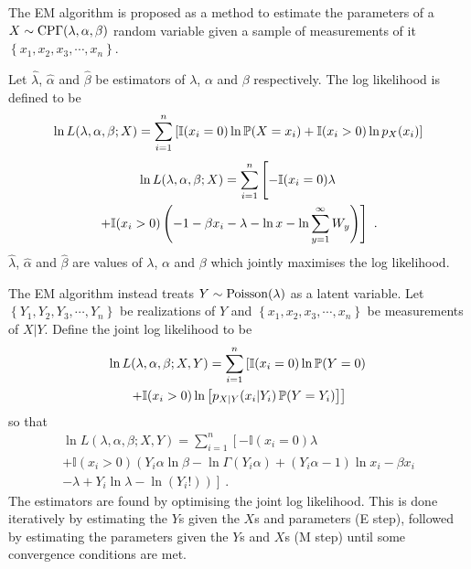 The EM algorithm \citep{dempster1977maximum} is proposed as a method to estimate the parameters of a $X\sim\operatorname{CP\Gamma}(\lambda,\alpha,\beta)$ random variable given a sample of measurements of it $\left\{x_1,x_2,x_3,\cdots,x_n\right\}$.

Let $\widehat{\lambda}$, $\widehat{\alpha}$ and $\widehat{\beta}$ be estimators of $\lambda$, $\alpha$ and $\beta$ respectively. The log likelihood is defined to be
\begin{equation*}
  \ln L(\lambda,\alpha,\beta;X) = \sum_{i=1}^n
  \left[
    \mathbb{I}(x_i=0)\ln \operatorname{\mathbb{P}}(X=x_i)
    +\mathbb{I}(x_i>0)\ln p_X(x_i)
  \right]
\end{equation*}
\begin{multline}
  \ln L(\lambda,\alpha,\beta;X) = \sum_{i=1}^n
  \left[
    -\mathbb{I}(x_i=0)\lambda
    \vphantom{\sum_i^i}
  \right.
  \\
  \left.
    +\mathbb{I}(x_i>0)\left(
    -1-\beta x_i-\lambda-\ln x -\ln\sum_{y=1}^\infty W_y
    \right)
  \right] \ .
\end{multline}
$\widehat{\lambda}$, $\widehat{\alpha}$ and $\widehat{\beta}$ are values of $\lambda$, $\alpha$ and $\beta$ which jointly maximises the log likelihood.

The EM algorithm \citep{dempster1977maximum} instead treats $Y\sim\operatorname{Poisson}(\lambda)$ as a latent variable. Let $\left\{Y_1,Y_2,Y_3,\cdots, Y_n\right\}$ be realizations of $Y$ and $\left\{x_1,x_2,x_3,\cdots, x_n\right\}$ be measurements of $X|Y$. Define the joint log likelihood to be
\begin{multline*}
  \ln L(\lambda,\alpha,\beta;X,Y)
  =
  \sum_{i=1}^n
  \left[
    \mathbb{I}(x_i=0)
    \ln
    \operatorname{\mathbb{P}}(Y=0)
  \right.
  \\
  \left.
    +
    \mathbb{I}(x_i>0)
    \ln
    \left[
      p_{X|Y}(x_i|Y_i)\operatorname{\mathbb{P}}(Y=Y_i)
    \right]
  \right]
\end{multline*}
so that
\begin{multline}
  \ln L(\lambda,\alpha,\beta;X,Y)=
  \sum_{i=1}^n
  \left[
    -\mathbb{I}(x_i=0)
    \lambda
  \right.
  \\
  \left.+
    \mathbb{I}(x_i>0)
    \left(
      Y_i\alpha\ln\beta-\ln\Gamma(Y_i\alpha)+(Y_i\alpha-1)\ln x_i - \beta x_i
    \right.
  \right.
  \\
  \left.
    \left.  
      - \lambda + Y_i \ln \lambda - \ln(Y_i!)
    \right)
  \right]
  \ .
\end{multline}
The estimators are found by optimising the joint log likelihood. This is done iteratively by estimating the $Y$s given the $X$s and parameters (E step), followed by estimating the parameters given the $Y$s and $X$s (M step) until some convergence conditions are met.


